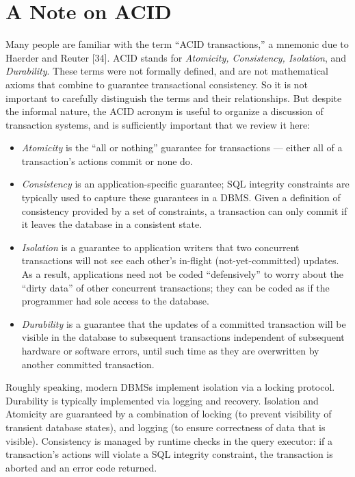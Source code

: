 \documentclass[a4paper,11pt,twoside,openright]{book}
\begin{document}
\hypertarget{a-note-on-acid}{%
\section{A Note on ACID}\label{a-note-on-acid}}

Many people are familiar with the term ``ACID transactions,'' a mnemonic
due to Haerder and Reuter {[}34{]}. ACID stands for \emph{Atomicity,
Consistency, Isolation}, and \emph{Durability}. These terms were not
formally defined, and are not mathematical axioms that combine to
guarantee transactional consistency. So it is not important to
carefully distinguish the terms and their relationships. But despite
the informal nature, the ACID acronym is useful to organize a discussion
of transaction systems, and is sufficiently important that we review it
here:

\begin{itemize}
\item
  \emph{Atomicity} is the ``all or nothing'' guarantee for transactions
  --- either all of a transaction's actions commit or none do.
\item
  \emph{Consistency} is an application-specific guarantee; SQL integrity
  constraints are typically used to capture these guarantees in a DBMS.
  Given a definition of consistency provided by a set of constraints, a
  transaction can only commit if it leaves the database in a consistent
  state.
\item
  \emph{Isolation} is a guarantee to application writers that two
  concurrent transactions will not see each other's in-flight
  (not-yet-committed) updates. As a result, applications need not be
  coded ``defensively'' to worry about the ``dirty data'' of other
  concurrent transactions; they can be coded as if the programmer had
  sole access to the database.

\item
  \emph{Durability} is a guarantee that the updates of a committed
  transaction will be visible in the database to subsequent
  transactions independent of subsequent hardware or software errors,
  until such time as they are overwritten by another committed
  transaction.
\end{itemize}

Roughly speaking, modern DBMSs implement isolation via a locking
protocol. Durability is typically implemented via logging and recovery.
Isolation and Atomicity are guaranteed by a combination of locking (to
prevent visibility of transient database states), and logging (to ensure
correctness of data that is visible). Consistency is managed by runtime
checks in the query executor: if a transaction's actions will violate a
SQL integrity constraint, the transaction is aborted and an error code
returned.
\end{document}

